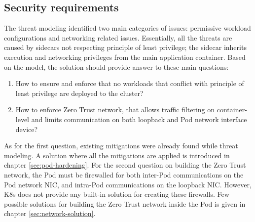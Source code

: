 \documentclass[english, 12pt, a4paper, sci, utf8, a-2b, online]{aaltothesis}
\begin{document}
\subsection{Security requirements}

The threat modeling identified two main categories of issues: permissive workload configurations and networking related issues. Essentially, all the threats are caused by sidecars not respecting principle of least privilege; the sidecar inherits execution and networking privileges from the main application container. Based on the model, the solution should provide answer to these main questions:


\begin{enumerate}
  \item How to ensure and enforce that no workloads that conflict with principle of least privilege are deployed to the cluster?
  \item How to enforce Zero Trust network, that allows traffic filtering on container-level and limits communication on both loopback and Pod network interface device?
\end{enumerate}

As for the first question, existing mitigations were already found while threat modeling. A solution where all the mitigations are applied is introduced in chapter \ref{sec:pod-hardening}. For the second question on building the Zero Trust network, the Pod must be firewalled for both inter-Pod communications on the Pod network NIC, and intra-Pod communications on the loopback NIC. However, K8s does not provide any built-in solution for creating these firewalls. Few possible solutions for building the Zero Trust network inside the Pod is given in chapter \ref{sec:network-solution}.
\end{document}
